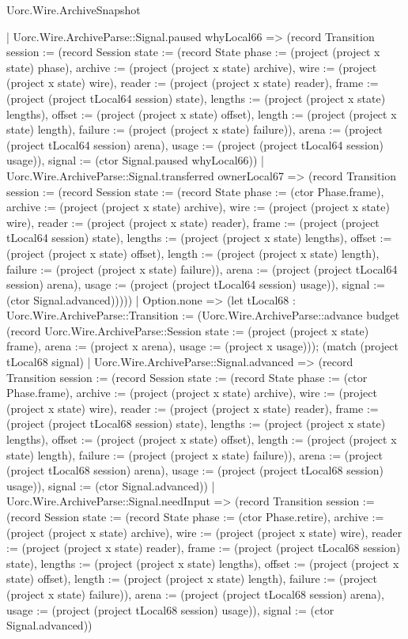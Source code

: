 \begin{lexlean}{Uorc.Wire.ArchiveSnapshot}
\begin{semanticmodule}
{        | Uorc.Wire.ArchiveParse::Signal.paused whyLocal66 => (record Transition {session := (record Session {state := (record State {phase := (project (project x state) phase), archive := (project (project x state) archive), wire := (project (project x state) wire), reader := (project (project x state) reader), frame := (project (project tLocal64 session) state), lengths := (project (project x state) lengths), offset := (project (project x state) offset), length := (project (project x state) length), failure := (project (project x state) failure)}), arena := (project (project tLocal64 session) arena), usage := (project (project tLocal64 session) usage)}), signal := (ctor Signal.paused whyLocal66)})
        | Uorc.Wire.ArchiveParse::Signal.transferred ownerLocal67 => (record Transition {session := (record Session {state := (record State {phase := (ctor Phase.frame), archive := (project (project x state) archive), wire := (project (project x state) wire), reader := (project (project x state) reader), frame := (project (project tLocal64 session) state), lengths := (project (project x state) lengths), offset := (project (project x state) offset), length := (project (project x state) length), failure := (project (project x state) failure)}), arena := (project (project tLocal64 session) arena), usage := (project (project tLocal64 session) usage)}), signal := (ctor Signal.advanced)}))))
    | Option.none => (let tLocal68 : Uorc.Wire.ArchiveParse::Transition := (Uorc.Wire.ArchiveParse::advance budget (record Uorc.Wire.ArchiveParse::Session {state := (project (project x state) frame), arena := (project x arena), usage := (project x usage)})); (match (project tLocal68 signal)
      | Uorc.Wire.ArchiveParse::Signal.advanced => (record Transition {session := (record Session {state := (record State {phase := (ctor Phase.frame), archive := (project (project x state) archive), wire := (project (project x state) wire), reader := (project (project x state) reader), frame := (project (project tLocal68 session) state), lengths := (project (project x state) lengths), offset := (project (project x state) offset), length := (project (project x state) length), failure := (project (project x state) failure)}), arena := (project (project tLocal68 session) arena), usage := (project (project tLocal68 session) usage)}), signal := (ctor Signal.advanced)})
      | Uorc.Wire.ArchiveParse::Signal.needInput => (record Transition {session := (record Session {state := (record State {phase := (ctor Phase.retire), archive := (project (project x state) archive), wire := (project (project x state) wire), reader := (project (project x state) reader), frame := (project (project tLocal68 session) state), lengths := (project (project x state) lengths), offset := (project (project x state) offset), length := (project (project x state) length), failure := (project (project x state) failure)}), arena := (project (project tLocal68 session) arena), usage := (project (project tLocal68 session) usage)}), signal := (ctor Signal.advanced)})
}
\end{semanticmodule}
\end{lexlean}
